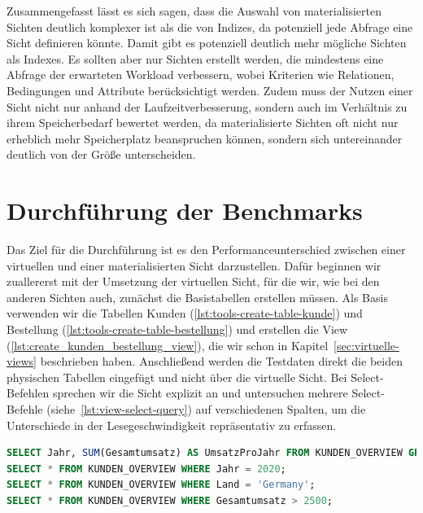 Zusammengefasst lässt es sich sagen, dass die Auswahl von materialisierten Sichten deutlich komplexer ist als die von Indizes, da potenziell jede Abfrage eine Sicht definieren könnte.
Damit gibt es potenziell deutlich mehr mögliche Sichten als Indexes.
Es sollten aber nur Sichten erstellt werden, die mindestens eine Abfrage der erwarteten Workload verbessern, wobei Kriterien wie Relationen, Bedingungen und Attribute berücksichtigt werden.
Zudem muss der Nutzen einer Sicht nicht nur anhand der Laufzeitverbesserung, sondern auch im Verhältnis zu ihrem Speicherbedarf bewertet werden, da materialisierte Sichten oft nicht nur erheblich mehr Speicherplatz beanspruchen können, sondern sich untereinander deutlich von der Größe unterscheiden.

\section{Durchführung der Benchmarks}\label{sec:durchfuhrung-der-benchmarks}

Das Ziel für die Durchführung ist es den Performanceunterschied zwischen einer virtuellen und einer materialisierten Sicht darzustellen.
Dafür beginnen wir zuallererst mit der Umsetzung der virtuellen Sicht, für die wir, wie bei den anderen Sichten auch, zunächst die Basistabellen erstellen müssen.
Als Basis verwenden wir die Tabellen Kunden (\ref{lst:tools-create-table-kunde}) und Bestellung (\ref{lst:tools-create-table-bestellung}) und erstellen die View (\ref{lst:create_kunden_bestellung_view}), die wir schon in Kapitel~\ref{sec:virtuelle-views} beschrieben haben.
Anschließend werden die Testdaten direkt die beiden physischen Tabellen eingefügt und nicht über die virtuelle Sicht.
Bei Select-Befehlen sprechen wir die Sicht explizit an und untersuchen mehrere Select-Befehle (siehe~\ref{lst:view-select-query}) auf verschiedenen Spalten, um die Unterschiede in der Lesegeschwindigkeit repräsentativ zu erfassen.

\vspace{-5pt}
\begin{lstlisting}[language=SQL,caption=Select-Abfragen auf alle Spalten der View,label={lst:view-select-query}]
SELECT Jahr, SUM(Gesamtumsatz) AS UmsatzProJahr FROM KUNDEN_OVERVIEW GROUP BY Jahr;
SELECT * FROM KUNDEN_OVERVIEW WHERE Jahr = 2020;
SELECT * FROM KUNDEN_OVERVIEW WHERE Land = 'Germany';
SELECT * FROM KUNDEN_OVERVIEW WHERE Gesamtumsatz > 2500;
\end{lstlisting}
\vspace{-5pt}


